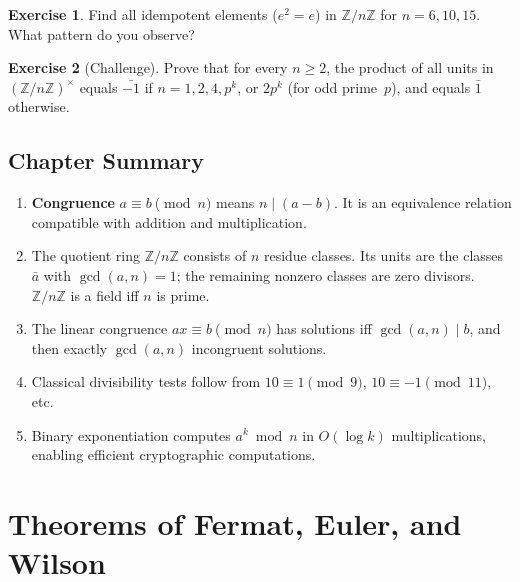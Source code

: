 \documentclass[12pt,a4paper,openany]{book}
\theoremstyle{definition}
\newtheorem{exercise}{Exercise}[chapter]
\theoremstyle{plain}
\theoremstyle{remark}
\newcommand{\Z}{\mathbb{Z}}
\begin{document}
\begin{exercise}
\label{exer:idempotent}
Find all idempotent elements ($e^2 = e$) in $\Z/n\Z$ for
$n = 6, 10, 15$.  What pattern do you observe?
\end{exercise}

\begin{exercise}[Challenge]
\label{exer:cong-challenge}
Prove that for every $n \ge 2$, the product of all units in $(\Z/n\Z)^\times$
equals $\bar{-1}$ if $n = 1, 2, 4, p^k$, or $2p^k$ (for odd prime~$p$),
and equals $\bar{1}$ otherwise.
\end{exercise}

\section{Chapter Summary}
\label{sec:ch3-summary}

\begin{enumerate}
  \item \textbf{Congruence} $a \equiv b \pmod{n}$ means $n \mid (a-b)$.
        It is an equivalence relation compatible with addition and multiplication.
  \item The quotient ring $\Z/n\Z$ consists of $n$ residue classes.
        Its units are the classes $\bar{a}$ with $\gcd(a,n)=1$; the remaining
        nonzero classes are zero divisors.  $\Z/n\Z$ is a field iff $n$ is prime.
  \item The linear congruence $ax \equiv b \pmod{n}$ has solutions iff
        $\gcd(a,n) \mid b$, and then exactly $\gcd(a,n)$ incongruent
        solutions.
  \item Classical divisibility tests follow from $10 \equiv 1 \pmod{9}$,
        $10 \equiv -1 \pmod{11}$, etc.
  \item Binary exponentiation computes $a^k \bmod n$ in $O(\log k)$
        multiplications, enabling efficient cryptographic computations.
\end{enumerate}



\chapter{Theorems of Fermat, Euler, and Wilson}
\label{ch:fermat-euler-wilson}
\end{document}
